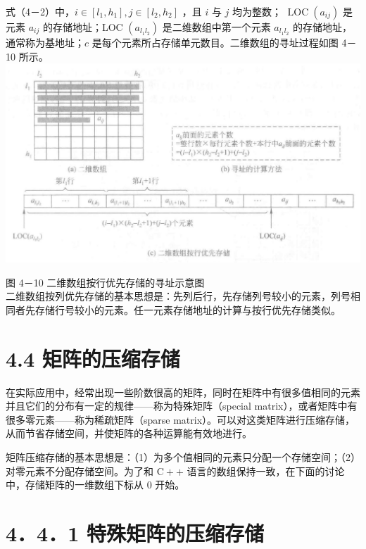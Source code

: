 \documentclass[10pt]{article}
\begin{document}
式（4－2）中，$i \in\left[l_{1}, h_{1}\right], j \in\left[l_{2}, h_{2}\right]$ ，且 $i$ 与 $j$ 均为整数； $\operatorname{LOC}\left(a_{i j}\right)$ 是元素 $a_{i j}$ 的存储地址；LOC $\left(a_{l_{1} l_{2}}\right)$ 是二维数组中第一个元素 $a_{l_{1} l_{2}}$ 的存储地址，通常称为基地址；$c$ 是每个元素所占存储单元数目。二维数组的寻址过程如图 4－10 所示。\\
\includegraphics[max width=\textwidth, center]{2025_06_06_704745ea57b15b2333e5g-122(1)}

图 4－10 二维数组按行优先存储的寻址示意图\\
二维数组按列优先存储的基本思想是：先列后行，先存储列号较小的元素，列号相同者先存储行号较小的元素。任一元素存储地址的计算与按行优先存储类似。

\section*{4.4 矩阵的压缩存储}
在实际应用中，经常出现一些阶数很高的矩阵，同时在矩阵中有很多值相同的元素并且它们的分布有一定的规律——称为特殊矩阵（special matrix），或者矩阵中有很多零元素——称为稀疏矩阵（sparse matrix）。可以对这类矩阵进行压缩存储，从而节省存储空间，并使矩阵的各种运算能有效地进行。

矩阵压缩存储的基本思想是：（1）为多个值相同的元素只分配一个存储空间；（2）对零元素不分配存储空间。为了和 $\mathrm{C}++$ 语言的数组保持一致，在下面的讨论中，存储矩阵的一维数组下标从 0 开始。

\section*{4．4．1 特殊矩阵的压缩存储}
\end{document}
